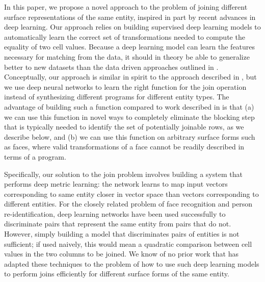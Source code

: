 In this paper, we propose a novel approach to the problem of joining different surface representations of the same entity, inspired in part by recent advances in deep learning.  Our approach relies on building supervised deep learning models to automatically learn the correct set of transformations needed to compute the equality of two cell values.  Because a deep learning model can learn the features necessary for matching from the data, it should in theory be able to generalize better to new datasets than the data driven approaches outlined in \cite{He:2015:SJS:2824032.2824036}.   Conceptually, our approach is similar in spirit to the approach described in \cite{auto-join-joining-tables-leveraging-transformations}, but we use deep neural networks to learn the right function for the join operation instead of synthesizing different programs for different entity types.  The advantage of building such a function compared to work described in \cite{auto-join-joining-tables-leveraging-transformations} is that (a) we can use this function in novel ways to completely eliminate the blocking step that is typically needed to identify the set of potentially joinable rows, as we describe below, and (b) we can use this function on arbitrary surface forms such as faces, where valid transformations of a face cannot be readily described in terms of a program.

Specifically, our solution to the join problem involves building a system that performs deep metric learning: the network learns to map input vectors corresponding to same entity closer in vector space than vectors corresponding to different entities.  For the closely related problem of face recognition and person re-identification, deep learning networks have been used successfully to discriminate pairs that represent the same entity from pairs that do not.  However, simply building a model that discriminates pairs of entities is not sufficient; if used naively, this would mean a quadratic comparison between cell values in the two columns to be joined.  We know of no prior work that has adapted these techniques to the problem of how to use such deep learning models to perform joins efficiently for different surface forms of the same entity.  

